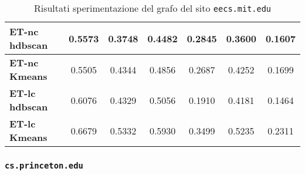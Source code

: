 \begin{table}[H]
\begin{tabular}{| l | c | c | c | c | c | c |}
	\textbf{ET-nc hdbscan} & 0.5573 & 0.3748 & 0.4482 & 0.2845 & 0.3600 & 0.1607\\ [2ex]
	 \hline
	\textbf{ET-nc Kmeans} & 0.5505 & 0.4344 & 0.4856 & 0.2687 & 0.4252 & 0.1699\\ [2ex]
	 \hline	
	\textbf{ET-lc hdbscan} & 0.6076 & 0.4329 & 0.5056 & 0.1910 & 0.4181 & 0.1464\\ [2ex]
	\hline
	\textbf{ET-lc Kmeans} & 0.6679 & 0.5332 & 0.5930 & 0.3499 & 0.5235 & 0.2311\\ [2ex]
	\hline	
	
	\end{tabular}
	\caption{Risultati sperimentazione del grafo del sito \texttt{eecs.mit.edu}}
	\label{metricheMit}
\end{table}

\subsubsection{\texttt{cs.princeton.edu}}

